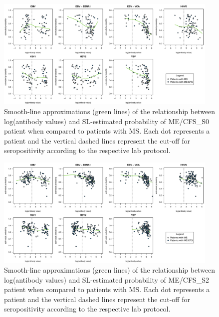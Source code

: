 \begin{figure}[h]
    \centering
    \includegraphics[width=0.95\textwidth]{chapter/2023-sym-and-herpesvirus/figures/figa2-ms-vs-s0.pdf}
    \caption[Smooth-line approximations of the relationship between log(antibody values) and SL-estimated probability of ME/CFS\_S0 patient when compared to patients with MS.]{Smooth-line approximations (green lines) of the relationship between log(antibody values) and SL-estimated probability of ME/CFS\_S0 patient when compared to patients with MS. Each dot represents a patient and the vertical dashed lines represent the cut-off for seropositivity according to the respective lab protocol.}
    \label{appendix:figa2-ms-vs-s0}
\end{figure}


\begin{figure}[h]
    \centering
    \includegraphics[width=0.95\textwidth]{chapter/2023-sym-and-herpesvirus/figures/figa3-ms-vs-s2.pdf}
    \caption[Smooth-line approximations of the relationship between log(antibody values) and SL-estimated probability of ME/CFS\_S2 patient when compared to patients with MS.]{Smooth-line approximations (green lines) of the relationship between log(antibody values) and SL-estimated probability of ME/CFS\_S2 patient when compared to patients with MS. Each dot represents a patient and the vertical dashed lines represent the cut-off for seropositivity according to the respective lab protocol.}
    \label{appendix:figa3-ms-vs-s2}
\end{figure}


